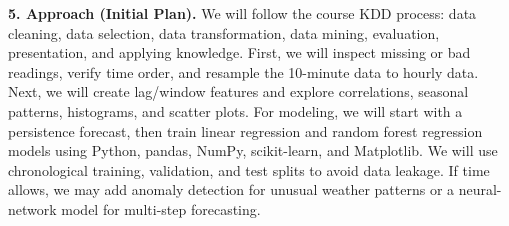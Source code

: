 \documentclass[11pt]{article}
\begin{document}
\medskip
\noindent\textbf{5. Approach (Initial Plan).}
We will follow the course KDD process: data cleaning, data selection, data transformation, data mining, evaluation, presentation, and applying knowledge. First, we will inspect missing or bad readings, verify time order, and resample the 10-minute data to hourly data. Next, we will create lag/window features and explore correlations, seasonal patterns, histograms, and scatter plots. For modeling, we will start with a persistence forecast, then train linear regression and random forest regression models using Python, pandas, NumPy, scikit-learn, and Matplotlib. We will use chronological training, validation, and test splits to avoid data leakage. If time allows, we may add anomaly detection for unusual weather patterns or a neural-network model for multi-step forecasting.
\end{document}
